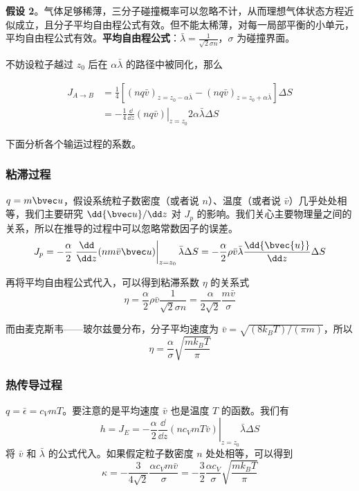 \textbf{假设 2}。气体足够稀薄，三分子碰撞概率可以忽略不计，从而理想气体状态方程近似成立，且分子平均自由程公式有效。但不能太稀薄，对每一局部平衡的小单元，平均自由程公式有效。\textbf{平均自由程公式}：$\bar \lambda = \frac{1}{\sqrt{2} \sigma n}$，$\sigma$ 为碰撞界面。

不妨设粒子越过 $z_0$ 后在 $\alpha \bar \lambda$ 的路径中被同化，那么

\begin{align}
J_{A\rightarrow B} &=\frac{1}{4}[(nq\bar v)_{z=z_0-\alpha \bar \lambda}-(nq\bar v)_{z=z_0+\alpha \bar \lambda}]\Delta S\\
&=-\frac{1}{4}\left.\frac{\dd}{\dd z}(nq\bar v)\right|_{z=z_0} 2\alpha\bar \lambda \Delta S
\end{align}

下面分析各个输运过程的系数。

\subsubsection{粘滞过程}
$q=m\bvec u$，假设系统粒子数密度（或者说 $n$）、温度（或者说 $\bar v$）几乎处处相等，我们主要研究 $\dd{\bvec u}/\dd z$ 对 $J_p$ 的影响。我们关心主要物理量之间的关系，所以在推导的过程中可以忽略常数因子的误差。
\begin{equation}
J_p=-\frac{\alpha}{2}\left.\frac{\dd}{\dd z}(nm\bar v \bvec u)\right|_{z=z_0}\bar \lambda \Delta S
=-\frac{\alpha}{2}\rho\bar v \bar \lambda \frac{\dd{\bvec{u}}}{\dd z}\Delta S
\end{equation}

再将平均自由程公式代入，可以得到粘滞系数 $\eta$ 的关系式
\begin{equation}
\eta = \frac{\alpha}{2}\rho\bar v \frac{1}{\sqrt{2}\sigma n}=\frac{\alpha}{2\sqrt{2}}\frac{m \bar v}{\sigma}
\end{equation}

而由麦克斯韦——玻尔兹曼分布，分子平均速度为 $\bar v=\sqrt{(8k_BT)/(\pi m)}$，所以
\begin{equation}
\eta = \frac{\alpha}{\sigma}\sqrt{\frac{mk_BT}{\pi}}
\end{equation}

\subsubsection{热传导过程}
$q=\bar \epsilon = c_VmT$。要注意的是平均速度 $\bar v$ 也是温度 $T$ 的函数。我们有
\begin{equation}
h=J_E=-\frac{\alpha}{2}\left.\frac{\dd }{\dd z}(nc_VmT\bar v)\right|_{z=z_0} \bar\lambda \Delta S
\end{equation}
将 $\bar v$ 和 $\bar\lambda$ 的公式代入。如果假定粒子数密度 $n$ 处处相等，可以得到
\begin{equation}
\kappa=-\frac{3}{4\sqrt{2}}\frac{\alpha c_Vm\bar v}{\sigma}=-\frac{3}{2}\frac{\alpha c_V}{\sigma}\sqrt{\frac{mk_BT}{\pi}}
\end{equation}


